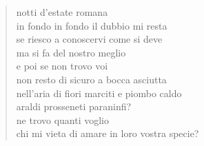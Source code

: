 \begin{verse}
    notti d'estate romana\\
    in fondo in fondo il dubbio mi resta\\
    se riesco a conoscervi come si deve\\
    ma si fa del nostro meglio\\
    e poi se non trovo voi\\
    non resto di sicuro a bocca asciutta\\
    nell'aria di fiori marciti e piombo caldo\\
    araldi prosseneti paraninfi?\\
    ne trovo quanti voglio\\
    chi mi vieta di amare in loro vostra specie?
\end{verse}
